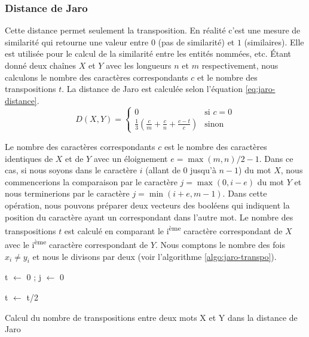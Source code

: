 \documentclass{KodeBook}
\begin{document}
\subsubsection{Distance de Jaro}

Cette distance permet seulement la transposition.
En réalité c'est une mesure de similarité qui retourne une valeur entre $0$ (pas de similarité) et $1$ (similaires). 
Elle est utilisée pour le calcul de la similarité entre les entités nommées, etc.
Étant donné deux chaînes $X$ et $Y$ avec les longueurs $n$ et $m$ respectivement, nous calculons le nombre des caractères correspondants $c$ et le nombre des transpositions $t$. 
La distance de Jaro est calculée selon l'équation \ref{eq:jaro-distance}.
\begin{equation}
	D(X, Y) = 
	\begin{cases}
	0 & \text{si } c = 0\\
	\frac{1}{3} (\frac{c}{m} + \frac{c}{n} + \frac{c-t}{c}) & \text{sinon}
	\end{cases}
	\label{eq:jaro-distance}
\end{equation}

Le nombre des caractères correspondants $c$  est le nombre des caractères identiques de $X$ et de $Y$ avec un éloignement $ e= \max (m, n)/2 - 1$. Dans ce cas, si nous soyons dans le caractère $i$ (allant de $0$ jusqu'à $n-1$) du mot $X$, nous commencerions la comparaison par le caractère $j=\max(0, i - e)$ du mot $Y$ et nous terminerions par le caractère $j=\min(i+e, m-1)$.
Dans cette opération, nous pouvons préparer deux vecteurs des booléens qui indiquent la position du caractère ayant un correspondant dans l'autre mot.
%
Le nombre des transpositions $t$ est calculé en comparant le i\textsuperscript{ème} caractère correspondant de $X$ avec le i\textsuperscript{ème} caractère correspondant de $Y$. 
Nous comptons le nombre des fois $x_i \ne y_i$  et nous le divisons par deux (voir l'algorithme \ref{algo:jaro-transpo}).
\vspace{-6pt}
\begin{algorithm}[ht]
	t $\leftarrow$ 0 ; j $\leftarrow$ 0\;
	
    
    t $\leftarrow$ t/2\;
    
    \caption{Calcul du nombre de transpositions entre deux mots X et Y dans la distance de Jaro \label{algo:jaro-transpo}}
	
\end{algorithm}
\end{document}
